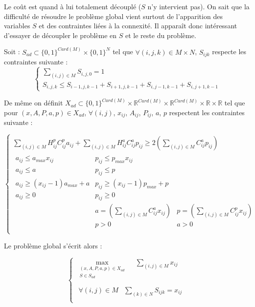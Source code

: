 \documentclass[a4paper,11pt] {article}
\begin{document}
Le coût est quand à lui totalement découplé ($S$ n'y intervient pas). On sait que la difficulté de résoudre le problème global vient surtout de l'apparition des variables $S$ et des contraintes liées à la connexité. Il apparaît donc intéressant d'essayer de découpler le problème en $S$ et le reste du problème.

Soit : $S_{ad}\subset \{0,1\}^{Card(M)} \times \{0,1\}^{N} $ tel que $\forall (i,j,k) \in M\times N$, $S_{ijk}$ respecte les contraintes suivante : 
\begin{equation}
\left\{
	\begin{array}{l}
		\sum\limits_{(i,j)\in M} S_{i,j,0} = 1\\
		S_{i,j,k}\leq S_{i-1,j,k-1} + S_{i+1,j,k-1} + S_{i,j-1,k-1} + S_{i,j+1,k-1}
	\end{array}
\right.
\end{equation}

De même on définit $X_{ad}\subset \{0,1\}^{Card(M)}\times \mathbb{R}^{Card(M)}\times \mathbb{R}^{Card(M)} \times \mathbb{R} \times \mathbb{R}$ tel que pour $(x,A,P,a,p)\in X_{ad}$, $\forall (i,j)$, $x_{ij}$, $A_{ij}$, $P_{ij}$, $a$, $p$ respectent les contraintes suivante : 

\begin{equation}
\left\{
\begin{array}{l}
\sum\limits_{(i,j)\in M} H^p_{ij}C^p_{ij}a_{ij} + \sum\limits_{(i,j)\in M} H^a_{ij}C^a_{ij}p_{ij} \geq 2(\sum\limits_{(i,j)\in M} C^a_{ij}p_{ij})\\
	\begin{array}{lll}
		a_{ij}\leq a_{max}x_{ij}&p_{ij}\leq p_{max}x_{ij}\\
		a_{ij}\leq a&p_{ij}\leq p\\
		a_{ij}\geq (x_{ij}-1)a_{max}+a&p_{ij}\geq (x_{ij}-1)p_{max}+p\\
		a_{ij} \geq 0&p_{ij} \geq 0\\
		&a = (\sum\limits_{(i,j)\in M} C^a_{ij}x_{ij})&p = (\sum\limits_{(i,j)\in M} C^p_{ij}x_{ij})\\
		&p > 0&a > 0\\
	\end{array}
\end{array}
\right.
\end{equation}

Le problème global s'écrit alors : 

\begin{equation}
\left\{
\begin{array}{l}
\max\limits_{\substack{(x,A,P,a,p)\in X_{ad}\\S\in S_{ad}} }\quad \sum\limits_{(i,j)\in M} x_{ij}\\
\\
	\begin{array}{ll}
		\forall{(i,j)} \in M&\sum\limits_{(k)\in N} S_{ijk} = x_{ij}\\
		\end{array}
\end{array}
\right.
\end{equation}
\end{document}
